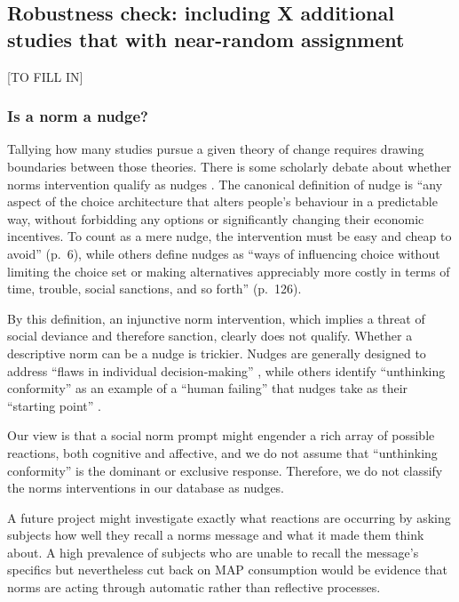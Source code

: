 \documentclass[sn-nature,pdflatex]{sn-jnl}
\begin{document}
\subsection{Robustness check: including X additional studies that with
near-random
assignment}\label{robustness-check-including-x-additional-studies-that-with-near-random-assignment}

{[}TO FILL IN{]}

\subsubsection{Is a norm a nudge?}\label{is-a-norm-a-nudge}

Tallying how many studies pursue a given theory of change requires
drawing boundaries between those theories. There is some scholarly
debate about whether norms intervention qualify as nudges
\citep{bicchieri2023}. The canonical definition of nudge
\citep{thaler2009} is ``any aspect of the choice architecture that
alters people's behaviour in a predictable way, without forbidding any
options or significantly changing their economic incentives. To count as
a mere nudge, the intervention must be easy and cheap to avoid'' (p.~6),
while others \citep{hausman2010} define nudges as ``ways of influencing
choice without limiting the choice set or making alternatives
appreciably more costly in terms of time, trouble, social sanctions, and
so forth'' (p.~126).

By this definition, an injunctive norm intervention, which implies a
threat of social deviance and therefore sanction, clearly does not
qualify. Whether a descriptive norm can be a nudge is trickier. Nudges
are generally designed to address ``flaws in individual
decision-making'' \citep[126]{hausman2010}, while others identify
``unthinking conformity'' as an example of a ``human failing'' that
nudges take as their ``starting point'' \citep[4]{mols2015}.

Our view is that a social norm prompt might engender a rich array of
possible reactions, both cognitive and affective, and we do not assume
that ``unthinking conformity'' is the dominant or exclusive response.
Therefore, we do not classify the norms interventions in our database as
nudges.

A future project might investigate exactly what reactions are occurring
by asking subjects how well they recall a norms message and what it made
them think about. A high prevalence of subjects who are unable to recall
the message's specifics but nevertheless cut back on MAP consumption
would be evidence that norms are acting through automatic rather than
reflective processes.
\end{document}
